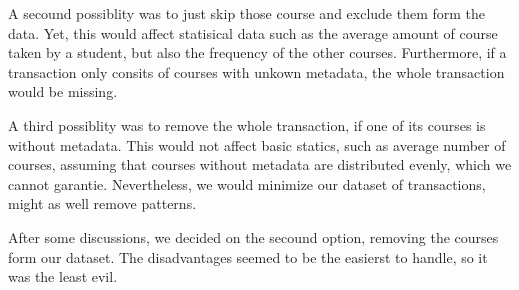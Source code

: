 A secound possiblity was to just skip those course and exclude them form the data. Yet, this would affect
statisical data such as the average amount of course taken by a student, but also the frequency of the other courses.
Furthermore, if a transaction only consits of courses with unkown metadata, the whole transaction would be missing.


A third possiblity was to remove the whole transaction, if one of its courses is without metadata. 
This would not affect basic statics, such as average number of courses, assuming that courses without metadata are distributed evenly, which we cannot garantie.
Nevertheless, we would minimize our dataset of transactions, might as well remove patterns.
\newline

After some discussions, we decided on the secound option, removing the courses form our dataset. The disadvantages seemed to be the easierst to handle, so it was the least evil. 



